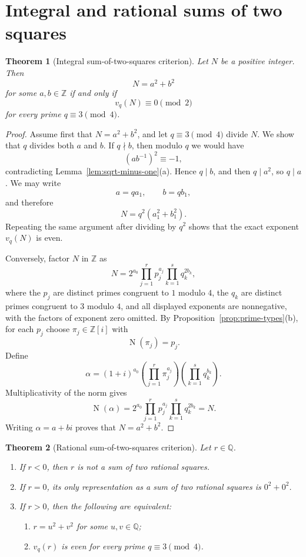 \documentclass[11pt,a4paper]{article}
\numberwithin{equation}{section}
\newtheorem{theorem}{Theorem}[section]
\theoremstyle{definition}
\theoremstyle{remark}
\newcommand{\Z}{\mathbb Z}
\newcommand{\Q}{\mathbb Q}
\newcommand{\Zi}{\Z[i]}
\newcommand{\Norm}{\operatorname{N}}
\newcommand{\divides}{\mathrel{|}}
\newcommand{\ndivides}{\mathrel{\nmid}}
\begin{document}
\section{Integral and rational sums of two squares}
\label{sec:sums}

\begin{theorem}[Integral sum-of-two-squares criterion]
\label{thm:integer-two-squares}
Let $N$ be a positive integer. Then
\[
 N=a^2+b^2
\]
for some $a,b\in\Z$ if and only if
\begin{equation}
 v_q(N)\equiv0\pmod2
 \label{eq:integer-two-square-condition}
\end{equation}
for every prime $q\equiv3\pmod4$.
\end{theorem}

\begin{proof}
Assume first that $N=a^2+b^2$, and let $q\equiv3\pmod4$ divide $N$. We show that $q$ divides both $a$ and $b$. If $q\ndivides b$, then modulo $q$ we would have
\[
 (ab^{-1})^2\equiv-1,
\]
contradicting Lemma~\ref{lem:sqrt-minus-one}(a). Hence $q\divides b$, and then $q\divides a^2$, so $q\divides a$. We may write
\[
 a=qa_1,
 \qquad
 b=qb_1,
\]
and therefore
\[
 N=q^2(a_1^2+b_1^2).
\]
Repeating the same argument after dividing by $q^2$ shows that the exact exponent $v_q(N)$ is even.

Conversely, factor $N$ in $\Z$ as
\begin{equation}
 N=2^{a_0}
   \prod_{j=1}^{r}p_j^{a_j}
   \prod_{k=1}^{s}q_k^{2b_k},
 \label{eq:N-factorization-sum-square}
\end{equation}
where the $p_j$ are distinct primes congruent to $1$ modulo $4$, the $q_k$ are distinct primes congruent to $3$ modulo $4$, and all displayed exponents are nonnegative, with the factors of exponent zero omitted. By Proposition~\ref{prop:prime-types}(b), for each $p_j$ choose $\pi_j\in\Zi$ with
\[
 \Norm(\pi_j)=p_j.
\]
Define
\[
 \alpha=(1+i)^{a_0}
 \left(\prod_{j=1}^{r}\pi_j^{a_j}\right)
 \left(\prod_{k=1}^{s}q_k^{b_k}\right).
\]
Multiplicativity of the norm gives
\[
 \Norm(\alpha)
 =2^{a_0}
  \prod_{j=1}^{r}p_j^{a_j}
  \prod_{k=1}^{s}q_k^{2b_k}
 =N.
\]
Writing $\alpha=a+bi$ proves that $N=a^2+b^2$.
\end{proof}

\begin{theorem}[Rational sum-of-two-squares criterion]
\label{thm:rational-two-squares}
Let $r\in\Q$.
\begin{enumerate}[label=\textup{(\alph*)}]
 \item If $r<0$, then $r$ is not a sum of two rational squares.
 \item If $r=0$, its only representation as a sum of two rational squares is $0^2+0^2$.
 \item If $r>0$, then the following are equivalent:
 \begin{enumerate}[label=\textup{(\roman*)}]
  \item $r=u^2+v^2$ for some $u,v\in\Q$;
  \item $v_q(r)$ is even for every prime $q\equiv3\pmod4$.
 \end{enumerate}
\end{enumerate}
\end{theorem}
\end{document}
